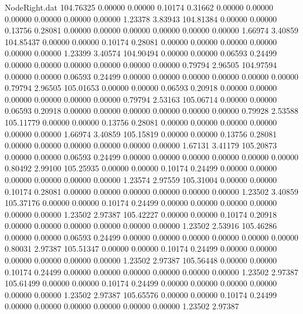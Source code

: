 \begin{filecontents}{NodeRight.dat}
 104.76325    0.00000    0.00000     0.10174    0.31662    0.00000    0.00000    0.00000    0.00000    0.00000    0.00000    1.23378    3.83943
 104.81384    0.00000    0.00000     0.13756    0.28081    0.00000    0.00000    0.00000    0.00000    0.00000    0.00000    1.66974    3.40859
 104.85437    0.00000    0.00000     0.10174    0.28081    0.00000    0.00000    0.00000    0.00000    0.00000    0.00000    1.23399    3.40574
 104.90494    0.00000    0.00000     0.06593    0.24499    0.00000    0.00000    0.00000    0.00000    0.00000    0.00000    0.79794    2.96505
 104.97594    0.00000    0.00000     0.06593    0.24499    0.00000    0.00000    0.00000    0.00000    0.00000    0.00000    0.79794    2.96505
 105.01653    0.00000    0.00000     0.06593    0.20918    0.00000    0.00000    0.00000    0.00000    0.00000    0.00000    0.79794    2.53163
 105.06714    0.00000    0.00000     0.06593    0.20918    0.00000    0.00000    0.00000    0.00000    0.00000    0.00000    0.79928    2.53588
 105.11779    0.00000    0.00000     0.13756    0.28081    0.00000    0.00000    0.00000    0.00000    0.00000    0.00000    1.66974    3.40859
 105.15819    0.00000    0.00000     0.13756    0.28081    0.00000    0.00000    0.00000    0.00000    0.00000    0.00000    1.67131    3.41179
 105.20873    0.00000    0.00000     0.06593    0.24499    0.00000    0.00000    0.00000    0.00000    0.00000    0.00000    0.80492    2.99100
 105.25935    0.00000    0.00000     0.10174    0.24499    0.00000    0.00000    0.00000    0.00000    0.00000    0.00000    1.23574    2.97559
 105.31004    0.00000    0.00000     0.10174    0.28081    0.00000    0.00000    0.00000    0.00000    0.00000    0.00000    1.23502    3.40859
 105.37176    0.00000    0.00000     0.10174    0.24499    0.00000    0.00000    0.00000    0.00000    0.00000    0.00000    1.23502    2.97387
 105.42227    0.00000    0.00000     0.10174    0.20918    0.00000    0.00000    0.00000    0.00000    0.00000    0.00000    1.23502    2.53916
 105.46286    0.00000    0.00000     0.06593    0.24499    0.00000    0.00000    0.00000    0.00000    0.00000    0.00000    0.80031    2.97387
 105.51347    0.00000    0.00000     0.10174    0.24499    0.00000    0.00000    0.00000    0.00000    0.00000    0.00000    1.23502    2.97387
 105.56448    0.00000    0.00000     0.10174    0.24499    0.00000    0.00000    0.00000    0.00000    0.00000    0.00000    1.23502    2.97387
 105.61499    0.00000    0.00000     0.10174    0.24499    0.00000    0.00000    0.00000    0.00000    0.00000    0.00000    1.23502    2.97387
 105.65576    0.00000    0.00000     0.10174    0.24499    0.00000    0.00000    0.00000    0.00000    0.00000    0.00000    1.23502    2.97387

\end{filecontents}
